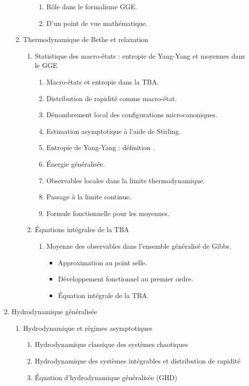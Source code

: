 \documentclass[8pt, landscape]{report}
\begin{document}
\begin{multicols}{3}
\begin{enumerate}
\begin{enumerate}
\begin{enumerate}
\begin{enumerate}
							\item Rôle dans le formalisme GGE.
							\item D’un point de vue mathématique.
						\end{enumerate}
				\end{enumerate}
			\item Thermodynamique de Bethe et relaxation
				\begin{enumerate}
					\item Statistique des macro-états : entropie de Yang-Yang et moyennes dans le GGE
						\begin{enumerate}
							\item Macro-états et entropie dans la TBA.
							\item Distribution de rapidité comme macro-état.
							\item Dénombrement local des configurations microcanoniques.
							\item Estimation asymptotique à l’aide de Stirling. 
							\item Entropie de Yang-Yang : définition . 
							\item Énergie généralisée. 
							\item Observables locales dans la limite thermodynamique.
							\item Passage à la limite continue.
							\item Formule fonctionnelle pour les moyennes.
						\end{enumerate}
					\item Équations intégrales de la TBA
						\begin{enumerate}
							\item Moyenne des observables dans l’ensemble généralisé de Gibbs.
								\begin{itemize}
									\item Approximation au point selle.
									\item Développement fonctionnel au premier ordre.
									\item Équation intégrale de la TBA.
								\end{itemize}
						\end{enumerate}
						
				\end{enumerate}
		\end{enumerate}
		
	\item Hydrodynamique généralisée
		\begin{enumerate}
			\item Hydrodynamique et régimes asymptotiques 
				\begin{enumerate}
					\item Hydrodynamique classique des systèmes chaotiques 
					\item Hydrodynamique des systèmes intégrables et distribution de rapidité 
					\item Équation d’hydrodynamique généralisée (GHD) 
				\end{enumerate}
		\end{enumerate}
		

\end{enumerate}
\end{multicols}
\end{document}

